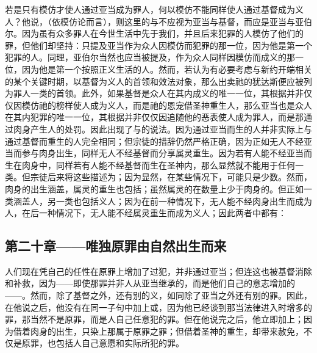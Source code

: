 若是只有模仿才使人通过亚当成为罪人，何以模仿不能同样使人通过基督成为义人？他说，（依模仿论而言），则这里的与不应视为亚当与基督，而应是亚当与亚伯尔。因为虽有众多罪人在今世生活中先于我们，并且后来犯罪的人模仿了他们的罪，但他们却坚持：只提及亚当作为众人因模仿而犯罪的那一位，因为他是第一个犯罪的人。同理，亚伯尔当然也应当被提及，作为众人同样因模仿而成义的那一位，因为他是第一个按照正义生活的人。然而，若认为有必要考虑与新约开端相关的某个关键时期，以基督为义人的首领和效法对象，那么出卖祂的犹达斯便应被列为罪人一类的首领。此外，如果基督是众人在其内成义的唯一一位，其根据并非仅仅因模仿祂的榜样使人成为义人，而是祂的恩宠借圣神重生人，那么亚当也是众人在其内犯罪的唯一一位，其根据并非仅仅因追随他的恶表使人成为罪人，而是那通过肉身产生人的处罚。因此出现了与的说法。因为通过亚当而生的人并非实际上与通过基督而重生的人完全相同；但宗徒的措辞仍然严格正确，因为正如无人不经亚当而参与肉身出生，同样无人不经基督而分享属灵重生。因为若有人能不经亚当而生在肉身中，同样若有人能不经基督而生在圣神内，那么显然就不能用于任何一类。但宗徒后来将这些描述为；因为显然，在某些情况下，可能只是少数。然而，肉身的出生涵盖，属灵的重生也包括；虽然属灵的在数量上少于肉身的。但正如一类涵盖人，另一类也包括义人；因为在前一种情况下，无人能不经肉身出生而成为人，在后一种情况下，无人能不经属灵重生而成为义人；因此两者中都有：\par


\subsection{第二十章——唯独原罪由自然出生而来}

人们现在凭自己的任性在原罪上增加了过犯，并非通过亚当；但连这也被基督消除和补救，因为——即使那罪并非人从亚当继承的，而是他们自己的意志增加的——。然而，除了基督之外，还有别的义，如同除了亚当之外还有别的罪。因此，在他说之后，他没有在同一子句中加上或，因为他已经谈到那当法律进入时增多的罪，那当然不是原罪，而是人自己任意犯的罪。但在他说完之后，他立即加上；因为借着肉身的出生，只染上那属于原罪之罪；但借着圣神的重生，却带来赦免，不仅是原罪，也包括人自己意愿和实际所犯的罪。\par

